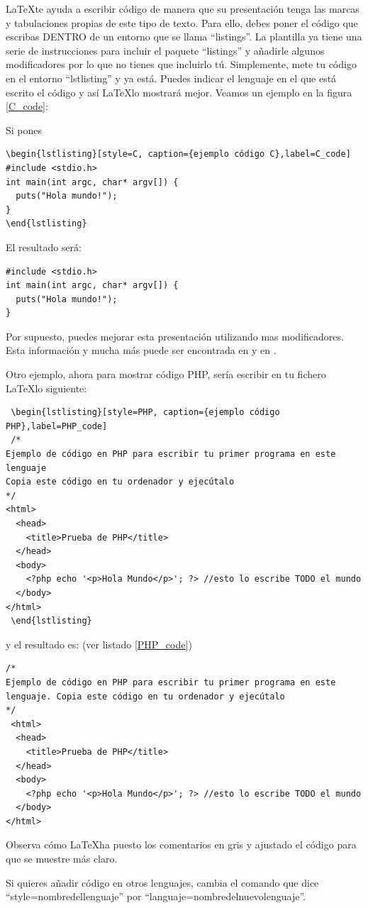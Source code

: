 \LaTeX te ayuda a escribir código de manera que su presentación tenga las marcas y tabulaciones propias de este tipo de texto. Para ello, debes poner el código que escribas DENTRO de un entorno  que se llama ``listings''.  La plantilla ya tiene una serie de instrucciones para incluir el paquete ``listings'' y añadirle algunos modificadores por lo que no tienes que incluirlo tú. Simplemente, mete tu código en el entorno ``lstlisting'' y ya está. Puedes indicar el lenguaje en el que está escrito el código y así \LaTeX lo mostrará mejor. Veamos un ejemplo en la figura \ref{C_code}:

Si pones 
\begin{verbatim}
\begin{lstlisting}[style=C, caption={ejemplo código C},label=C_code]
#include <stdio.h>
int main(int argc, char* argv[]) {
  puts("Hola mundo!");
}
\end{lstlisting}
\end{verbatim}

El resultado será:
\begin{lstlisting}[style=C, caption={ejemplo código C},label=C_code]
#include <stdio.h>
int main(int argc, char* argv[]) {
  puts("Hola mundo!");
}
\end{lstlisting}

Por supuesto, puedes mejorar esta presentación utilizando mas modificadores. Esta información y mucha más puede ser encontrada en \cite{listing_packagge} y en \cite{heinz1listings}.

Otro ejemplo, ahora para mostrar código PHP, sería escribir en tu fichero \LaTeX lo siguiente:
\begin{verbatim}
 \begin{lstlisting}[style=PHP, caption={ejemplo código PHP},label=PHP_code]
 /* 
Ejemplo de código en PHP para escribir tu primer programa en este lenguaje
Copia este código en tu ordenador y ejecútalo
*/
<html>
  <head>
    <title>Prueba de PHP</title>
  </head>
  <body>
    <?php echo '<p>Hola Mundo</p>'; ?> //esto lo escribe TODO el mundo
  </body>
</html>
 \end{lstlisting}
\end{verbatim}
 
 y el resultado es: (ver listado \ref{PHP_code})
 
 \begin{lstlisting}[style=PHP, caption={ejemplo código PHP},label=PHP_code]
/* 
Ejemplo de código en PHP para escribir tu primer programa en este lenguaje. Copia este código en tu ordenador y ejecútalo
*/
 <html>
  <head>
    <title>Prueba de PHP</title>
  </head>
  <body>
    <?php echo '<p>Hola Mundo</p>'; ?> //esto lo escribe TODO el mundo
  </body>
</html>
 \end{lstlisting}
 
 Observa cómo \LaTeX ha puesto los comentarios en gris y ajustado el código para que se muestre más claro.
 
 Si quieres añadir código en otros lenguajes, cambia el comando que dice ``style=nombredellenguaje'' por ``languaje=nombredelnuevolenguaje''.